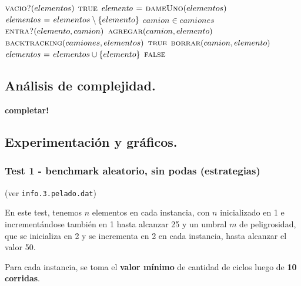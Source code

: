 \vspace*{0.5cm}


\begin{codebox}
\li \If $\textnormal{\scshape vacio?}(elementos)$
\li     \Then
            \Return $\textnormal{\scshape true}$
        \End
\li $\id{elemento} \gets \proc{dameUno}(elementos)$
\li $\id{elementos} \gets elementos \setminus \{elemento\}$
\li \For $camion \in camiones$
\li     \Do
            \If $\textnormal{\scshape entra?}(elemento, camion)$
\li             \Then
                    $\textnormal{\scshape agregar}(camion, elemento)$
\li                 \If $\textnormal{\scshape backtracking}(camiones, elementos)$
                        \Then
\li                         \Return $\textnormal{\scshape true}$
\li                 \Else
\li                     $\textnormal{\scshape borrar}(camion, elemento)$
                    \End
            \End
        \End
\li $\id{elementos} \gets elementos \cup \{elemento\}$
\li \Return $\textnormal{\scshape false}$
\end{codebox}



\newpage
\subsection{Análisis de complejidad.}

\vspace*{0.3cm}

\textbf{completar!}


\newpage
\subsection{Experimentación y gráficos.}

\vspace*{0.3cm}

\subsubsection{Test 1 - benchmark aleatorio, sin podas (estrategias)}

(ver \verb|info.3.pelado.dat|) \medskip

En este test, tenemos $n$ elementos en cada instancia, con $n$ inicializado en 1 e incrementándose
también en 1 hasta alcanzar 25 y un umbral $m$ de peligrosidad, que se inicializa en 2 y se incrementa
en 2 en cada instancia, hasta alcanzar el valor 50.

Para cada instancia, se toma el \textbf{valor mínimo} de cantidad de ciclos luego de \textbf{10 corridas}.

